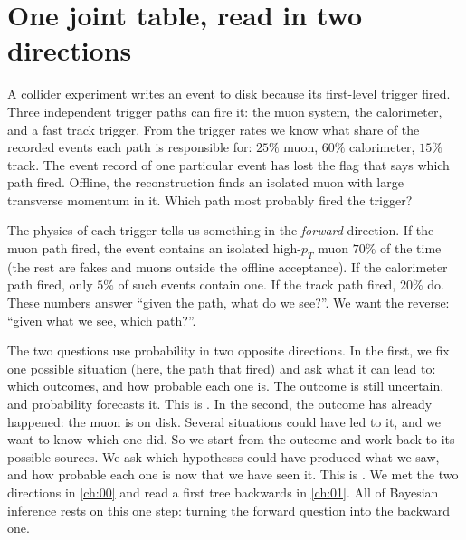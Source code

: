 \section{One joint table, read in two directions}
\label{5a:sec:two-directions}

A collider experiment writes an event to disk because its first-level trigger
fired. Three independent trigger paths can fire it: the muon system, the
calorimeter, and a fast track trigger. From the trigger rates we know what share
of the recorded events each path is responsible for: $25\%$ muon, $60\%$
calorimeter, $15\%$ track. The event record of one particular event has lost the
flag that says which path fired. Offline, the reconstruction finds an isolated
muon with large transverse momentum in it. Which path most probably fired the
trigger?

The physics of each trigger tells us something in the \emph{forward} direction. If
the muon path fired, the event contains an isolated high-$p_T$ muon $70\%$ of the
time (the rest are fakes and muons outside the offline acceptance). If the
calorimeter path fired, only $5\%$ of such events contain one. If the track path
fired, $20\%$ do. These numbers answer ``given the path, what do we see?''. We
want the reverse: ``given what we see, which path?''.

The two questions use probability in two opposite directions. In the first, we
fix one possible situation (here, the path that fired) and ask what it can lead
to: which outcomes, and how probable each one is. The outcome is still
uncertain, and probability forecasts it. This is . In the
second, the outcome has already happened: the muon is on disk. Several
situations could have led to it, and we want to know which one did. So we start
from the outcome and work back to its possible sources. We ask which hypotheses
could have produced what we saw, and how probable each one is now that we have
seen it. This is . We met the two directions in \cref{ch:00}
and read a first tree backwards in \cref{ch:01}. All of Bayesian inference rests
on this one step: turning the forward question into the backward one.

